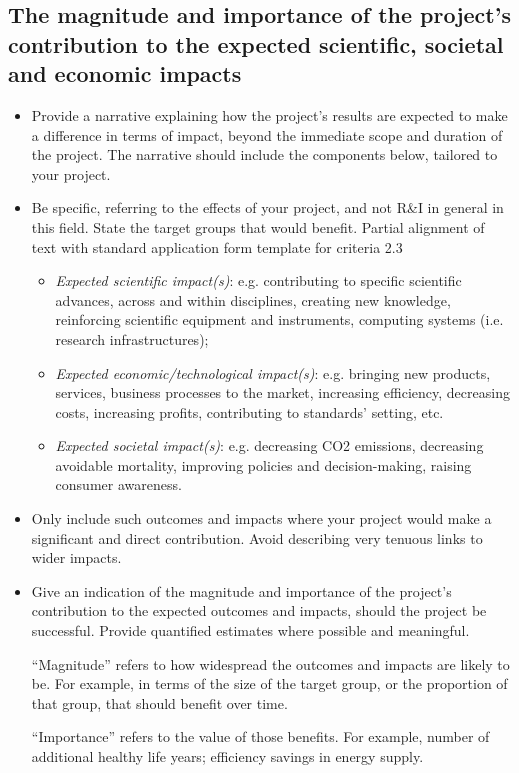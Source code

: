 \documentclass[11pt,draftproposal]{msca-pf}
\begin{document}
\subsection{The magnitude and importance of the project’s contribution to the
expected scientific, societal and economic impacts}

\begin{itemize}
    \item Provide a narrative explaining how the project’s results are expected
    to make a difference in terms of impact, beyond the immediate scope and
    duration of the project. The narrative should include the components below,
    tailored to your project.

    \item Be specific, referring to the effects of your project, and not R\&I
    in general in this field. State the target groups that would benefit.
Partial alignment of text with standard application form template for criteria 2.3
    \begin{itemize}
        \item \emph{Expected scientific impact(s)}: e.g. contributing to specific
        scientific advances, across and within disciplines, creating new knowledge,
        reinforcing scientific equipment and instruments, computing systems (i.e.
        research infrastructures);

        \item \emph{Expected economic/technological impact(s)}: e.g. bringing new
        products, services, business processes to the market, increasing efficiency,
        decreasing costs, increasing profits, contributing to standards’ setting,
        etc.

        \item \emph{Expected societal impact(s)}: e.g. decreasing CO2 emissions,
        decreasing avoidable mortality, improving policies and decision-making,
        raising consumer awareness.
    \end{itemize}

    \item Only include such outcomes and impacts where your project would make
    a significant and direct contribution. Avoid describing very tenuous links
    to wider impacts.

    \item Give an indication of the magnitude and importance of the project's
    contribution to the expected outcomes and impacts, should the project be
    successful. Provide quantified estimates where possible and meaningful.

    ``Magnitude'' refers to how widespread the outcomes and impacts are likely
    to be. For example, in terms of the size of the target group, or the
    proportion of that group, that should benefit over time.

    ``Importance'' refers to the value of those benefits. For example, number of
    additional healthy life years; efficiency savings in energy supply.
\end{itemize}
\end{document}

